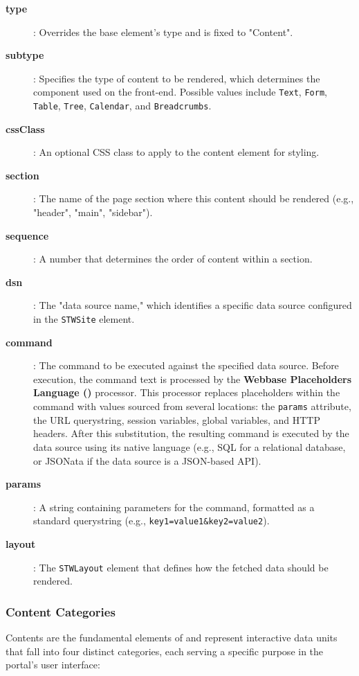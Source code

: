 \begin{description}
\item[\textbf{type}]: Overrides the base element's type and is fixed to "Content".
\item[\textbf{subtype}]: Specifies the type of content to be rendered, which determines the component used on the front-end. Possible values include \texttt{Text}, \texttt{Form}, \texttt{Table}, \texttt{Tree}, \texttt{Calendar}, and \texttt{Breadcrumbs}.
\item[\textbf{cssClass}]: An optional CSS class to apply to the content element for styling.
\item[\textbf{section}]: The name of the page section where this content should be rendered (e.g., "header", "main", "sidebar").
\item[\textbf{sequence}]: A number that determines the order of content within a section.
\item[\textbf{dsn}]: The "data source name," which identifies a specific data source configured in the \texttt{STWSite} element.
\item[\textbf{command}]: The command to be executed against the specified data source. Before execution, the command text is processed by the \textbf{Webbase Placeholders Language (\wbpl{})} processor. This processor replaces placeholders within the command with values sourced from several locations: the \texttt{params} attribute, the URL querystring, session variables, global variables, and HTTP headers. After this substitution, the resulting command is executed by the data source using its native language (e.g., SQL for a relational database, or JSONata if the data source is a JSON-based API).
\item[\textbf{params}]: A string containing parameters for the command, formatted as a standard querystring (e.g., \texttt{key1=value1\&key2=value2}).
\item[\textbf{layout}]: The \texttt{STWLayout} element that defines how the fetched data should be rendered.
\end{description}

\subsubsection{Content Categories}
\label{sec:content-categories}

Contents are the fundamental elements of \wbdl{} and represent interactive data units that fall into four distinct categories, each serving a specific purpose in the portal's user interface:

